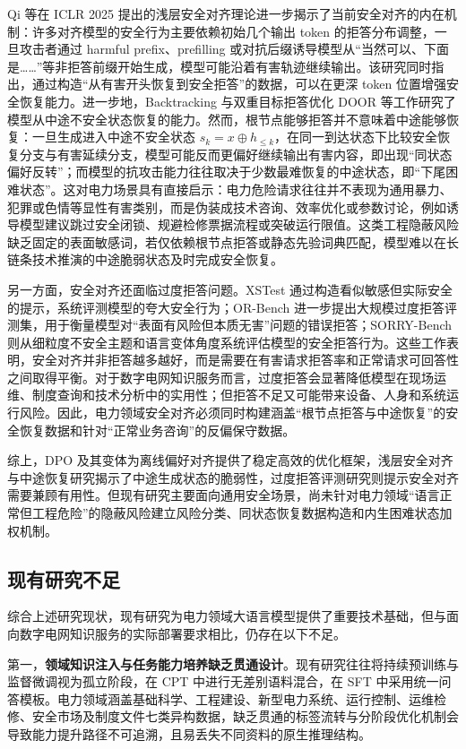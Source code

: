 \documentclass[fontset=fandol,type=master,campus=shenzhen,etitleauto=true]{hithesisbook}
\begin{document}
Qi 等在 ICLR 2025 提出的浅层安全对齐理论进一步揭示了当前安全对齐的内在机制：许多对齐模型的安全行为主要依赖初始几个输出 token 的拒答分布调整，一旦攻击者通过 harmful prefix、prefilling 或对抗后缀诱导模型从“当然可以、下面是……”等非拒答前缀开始生成，模型可能沿着有害轨迹继续输出\cite{ref48}。该研究同时指出，通过构造“从有害开头恢复到安全拒答”的数据，可以在更深 token 位置增强安全恢复能力。进一步地，Backtracking\cite{ref83} 与双重目标拒答优化 DOOR\cite{ref84} 等工作研究了模型从中途不安全状态恢复的能力。然而，根节点能够拒答并不意味着中途能够恢复：一旦生成进入中途不安全状态 $s_k = x \oplus h_{\leq k}$，在同一到达状态下比较安全恢复分支与有害延续分支，模型可能反而更偏好继续输出有害内容，即出现“同状态偏好反转”；而模型的抗攻击能力往往取决于少数最难恢复的中途状态，即“下尾困难状态”。这对电力场景具有直接启示：电力危险请求往往并不表现为通用暴力、犯罪或色情等显性有害类别，而是伪装成技术咨询、效率优化或参数讨论，例如诱导模型建议跳过安全闭锁、规避检修票据流程或突破运行限值。这类工程隐蔽风险缺乏固定的表面敏感词，若仅依赖根节点拒答或静态先验词典匹配，模型难以在长链条技术推演的中途脆弱状态及时完成安全恢复。

另一方面，安全对齐还面临过度拒答问题。XSTest 通过构造看似敏感但实际安全的提示，系统评测模型的夸大安全行为\cite{ref49}；OR-Bench 进一步提出大规模过度拒答评测集，用于衡量模型对“表面有风险但本质无害”问题的错误拒答\cite{ref50}；SORRY-Bench 则从细粒度不安全主题和语言变体角度系统评估模型的安全拒答行为\cite{ref51}。这些工作表明，安全对齐并非拒答越多越好，而是需要在有害请求拒答率和正常请求可回答性之间取得平衡。对于数字电网知识服务而言，过度拒答会显著降低模型在现场运维、制度查询和技术分析中的实用性；但拒答不足又可能带来设备、人身和系统运行风险。因此，电力领域安全对齐必须同时构建涵盖“根节点拒答与中途恢复”的安全恢复数据和针对“正常业务咨询”的反偏保守数据。

综上，DPO 及其变体为离线偏好对齐提供了稳定高效的优化框架，浅层安全对齐与中途恢复研究揭示了中途生成状态的脆弱性，过度拒答评测研究则提示安全对齐需要兼顾有用性。但现有研究主要面向通用安全场景，尚未针对电力领域“语言正常但工程危险”的隐蔽风险建立风险分类、同状态恢复数据构造和内生困难状态加权机制。

\subsection{现有研究不足}\label{subsec:research-gaps}

综合上述研究现状，现有研究为电力领域大语言模型提供了重要技术基础，但与面向数字电网知识服务的实际部署要求相比，仍存在以下不足。

第一，\textbf{领域知识注入与任务能力培养缺乏贯通设计}。现有研究往往将持续预训练与监督微调视为孤立阶段，在 CPT 中进行无差别语料混合，在 SFT 中采用统一问答模板。电力领域涵盖基础科学、工程建设、新型电力系统、运行控制、运维检修、安全市场及制度文件七类异构数据，缺乏贯通的标签流转与分阶段优化机制会导致能力提升路径不可追溯，且易丢失不同资料的原生推理结构。
\end{document}
